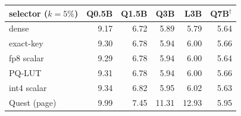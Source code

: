 \begin{tabular}{l r r r r r}
\toprule
selector ($k{=}5\%$) & Q0.5B & Q1.5B & Q3B & L3B & Q7B$^\dagger$ \\
\midrule
dense & 9.17 & 6.72 & 5.89 & 5.79 & 5.64 \\
exact-key & 9.30 & 6.78 & 5.94 & 6.00 & 5.66 \\
fp8 scalar & 9.29 & 6.78 & 5.94 & 6.00 & 5.64 \\
PQ-LUT & 9.31 & 6.78 & 5.94 & 6.00 & 5.66 \\
int4 scalar & 9.34 & 6.82 & 5.95 & 6.02 & 5.63 \\
Quest (page) & 9.99 & 7.45 & 11.31 & 12.93 & 5.95 \\
\bottomrule
\end{tabular}

